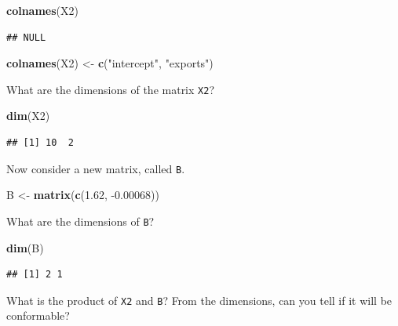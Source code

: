 \documentclass[
]{book}
\newenvironment{Shaded}{\begin{snugshade}}{\end{snugshade}}
\newcommand{\FloatTok}[1]{\textcolor[rgb]{0.00,0.00,0.81}{#1}}
\newcommand{\KeywordTok}[1]{\textcolor[rgb]{0.13,0.29,0.53}{\textbf{#1}}}
\newcommand{\NormalTok}[1]{#1}
\newcommand{\StringTok}[1]{\textcolor[rgb]{0.31,0.60,0.02}{#1}}
\theoremstyle{definition}
\theoremstyle{definition}
\theoremstyle{definition}
\theoremstyle{definition}
\theoremstyle{remark}
\begin{document}
\begin{Shaded}
\begin{Highlighting}[]
\KeywordTok{colnames}\NormalTok{(X2)}
\end{Highlighting}
\end{Shaded}

\begin{verbatim}
## NULL
\end{verbatim}

\begin{Shaded}
\begin{Highlighting}[]
\KeywordTok{colnames}\NormalTok{(X2) <-}\StringTok{ }\KeywordTok{c}\NormalTok{(}\StringTok{"intercept"}\NormalTok{, }\StringTok{"exports"}\NormalTok{)}
\end{Highlighting}
\end{Shaded}

What are the dimensions of the matrix \texttt{X2}?

\begin{Shaded}
\begin{Highlighting}[]
\KeywordTok{dim}\NormalTok{(X2)}
\end{Highlighting}
\end{Shaded}

\begin{verbatim}
## [1] 10  2
\end{verbatim}

Now consider a new matrix, called \texttt{B}.

\begin{Shaded}
\begin{Highlighting}[]
\NormalTok{B <-}\StringTok{ }\KeywordTok{matrix}\NormalTok{(}\KeywordTok{c}\NormalTok{(}\FloatTok{1.62}\NormalTok{, }\FloatTok{-0.00068}\NormalTok{))}
\end{Highlighting}
\end{Shaded}

What are the dimensions of \texttt{B}?

\begin{Shaded}
\begin{Highlighting}[]
\KeywordTok{dim}\NormalTok{(B)}
\end{Highlighting}
\end{Shaded}

\begin{verbatim}
## [1] 2 1
\end{verbatim}

What is the product of \texttt{X2} and \texttt{B}? From the dimensions, can you tell if it will be conformable?
\end{document}
